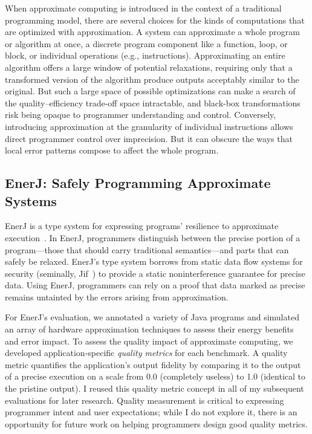 When approximate computing is introduced in the context of a traditional
programming model, there are several choices for the kinds of computations
that are optimized with approximation. A system can approximate a whole
program or algorithm at once, a discrete program component like a function,
loop, or block, or individual operations (e.g., instructions).
Approximating an entire algorithm
offers a large window of potential relaxations,
requiring only that a transformed version of the algorithm produce outputs
acceptably similar to the original.
But such a large space of possible optimizations can make a search of the
quality--efficiency trade-off space intractable, and black-box transformations
risk being opaque to programmer understanding and control.
Conversely, introducing approximation at the granularity of individual
instructions allows direct programmer control over imprecision. But it can
obscure the ways that local error patterns compose to affect the whole
program.


\subsection{EnerJ: Safely Programming Approximate Systems}
\label{sec:prelim:enerj}

EnerJ is a type system for expressing programs' resilience to approximate
execution~\cite{enerj}. In EnerJ, programmers distinguish between the precise
portion of a program---those that should carry traditional semantics---and
parts that can safely be relaxed. EnerJ's type system borrows from static data
flow systems for security (seminally, Jif~\cite{jif}) to provide a static
noninterference guarantee for precise data. Using EnerJ, programmers can rely
on a proof that data marked as precise remains untainted by the errors arising
from approximation.

For EnerJ's evaluation, we annotated a variety of Java
programs and simulated an array of hardware approximation techniques to assess
their energy benefits and error impact. To assess the quality impact of
approximate computing, we developed application-specific \emph{quality
metrics} for each benchmark. A quality metric quantifies the application's
output fidelity by comparing it to the output of a precise execution on a
scale from 0.0 (completely useless) to 1.0 (identical to the pristine output).
I reused this quality metric concept in all of my subsequent evaluations for
later research. Quality measurement is critical to expressing programmer
intent and user expectations; while I do not explore it, there is an
opportunity for future work on helping programmers design good quality
metrics.

